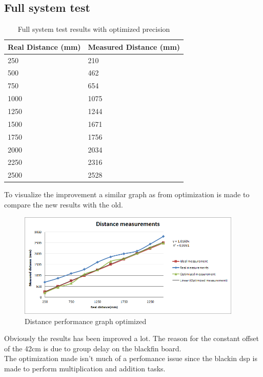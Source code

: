 \subsection{Full system test}
\begin{table}[H]
\centering
    \begin{tabular}{|l|l|}
    \hline
    Real Distance (mm) & Measured Distance (mm) \\ \hline
    250                & 210                   \\ \hline
    500                & 462                    \\ \hline
    750                & 654                   \\ \hline
    1000               & 1075                   \\ \hline
    1250               & 1244                   \\ \hline
    1500               & 1671                   \\ \hline
    1750               & 1756                   \\ \hline
    2000               & 2034                   \\ \hline
    2250               & 2316                   \\ \hline
    2500               & 2528                   \\ \hline
    \end{tabular}
    \caption{Full system test results with optimized precision}
\end{table}
To visualize the improvement a similar graph as from optimization is made to compare the new results with the old.\\
\begin{figure}[H]
\centering
\includegraphics[width=0.95\textwidth]{billeder/first_test_results_graph_optimized}
\caption{Distance performance graph optimized}
\end{figure}
Obviously the results has been improved a lot. The reason for the constant offset of the 42cm is due to group delay on the blackfin board.\\
The optimization made isn't much of a perfomance issue since the blackin dsp is made to perform multiplication and addition tasks.\\
